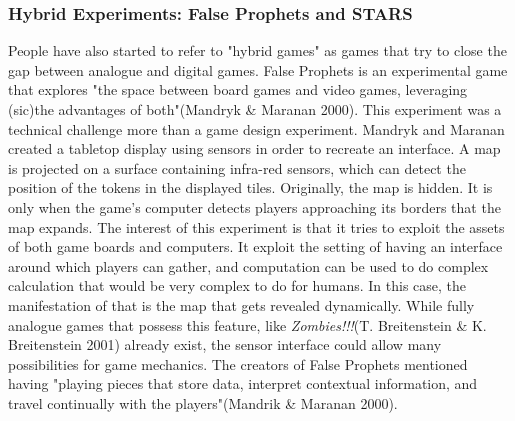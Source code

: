 \subsubsection{Hybrid Experiments: False Prophets and STARS}
People have also started to refer to "hybrid games" as games that try to close the gap between analogue and digital games. False Prophets is an experimental game that explores "the space between board games and video games, leveraging (sic)the advantages of both"(Mandryk \& Maranan 2000). This experiment was a technical challenge more than a game design experiment. Mandryk and Maranan created a tabletop display using sensors in order to recreate an interface. A map is projected on a surface containing infra-red sensors, which can detect the position of the tokens in the displayed tiles. Originally, the map is hidden. It is only when the game's computer detects players approaching its borders that the map expands. The interest of this experiment is that it tries to exploit the assets of both game boards and computers. It exploit the setting of having an interface around which players can gather, and computation can be used to do complex calculation that would be very complex to do for humans. In this case, the manifestation of that is the map that gets revealed dynamically. While fully analogue games  that possess this feature, like \textit{Zombies!!!}(T. Breitenstein \& K. Breitenstein 2001) already exist, the sensor interface could allow many possibilities for game mechanics. The creators of False Prophets mentioned having "playing pieces that store data, interpret contextual information, and travel continually with the players"(Mandrik \& Maranan 2000).
\\\\
